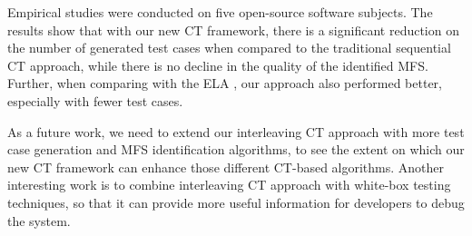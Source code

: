 \documentclass{sig-alternate}
\begin{document}
Empirical studies were conducted on five open-source software subjects. The results show that with our new CT framework, there is a significant reduction on the number of generated test cases when compared to the traditional sequential CT approach, while there is no decline in the quality of the identified MFS. Further, when comparing with the ELA \cite{martinez2009locating,martinez2008algorithms}, our approach also performed better, especially with fewer test cases.

As a future work, we need to extend our interleaving CT approach with more test case generation and MFS identification algorithms, to see the extent on which our new CT framework can enhance those different CT-based algorithms. Another interesting work is to combine interleaving CT approach with white-box testing techniques, so that it can provide more useful information for developers to debug the system.




%

%
%
%
\end{document}
